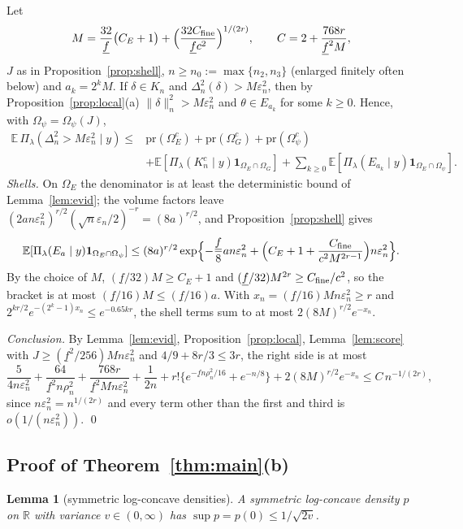 \documentclass[11pt]{article}
\newtheorem{lemma}{Lemma}
\theoremstyle{definition}
\theoremstyle{remark}
\newcommand{\R}{\mathbb{R}}
\newcommand{\E}{\mathbb{E}}
\newcommand{\pr}{\mathrm{pr}}
\newcommand{\en}{\varepsilon_n}
\newcommand{\fl}{\underline f}
\newcommand{\nn}[1]{\|#1\|_n}
\newcommand{\ind}{\mathbf 1}
\begin{document}
Let
\[
M=\frac{32}{\fl}\bigl(C_E+1\bigr)+\Bigl(\frac{32C_{\rm fine}}{\fl c^2}\Bigr)^{1/(2r)},\qquad C=2+\frac{768r}{\fl^2M},
\]
$J$ as in Proposition~\ref{prop:shell}, $n\ge n_0:=\max\{n_2,n_3\}$ (enlarged finitely often below) and $a_k=2^kM$. If $\delta\in K_n$ and $\Delta_n^2(\delta)>M\en^2$, then by Proposition~\ref{prop:local}(a) $\nn{\delta}^2>M\en^2$ and $\theta\in E_{a_k}$ for some $k\ge0$. Hence, with $\Omega_\psi=\Omega_\psi(J)$,
\begin{align*}
\E\,\Pi_\lambda(\Delta_n^2>M\en^2\mid y)\le{}&\pr(\Omega_E^c)+\pr(\Omega_G^c)+\pr(\Omega_\psi^c)\\
&+\E[\Pi_\lambda(K_n^c\mid y)\ind_{\Omega_E\cap\Omega_G}]+\sum_{k\ge0}\E[\Pi_\lambda(E_{a_k}\mid y)\ind_{\Omega_E\cap\Omega_\psi}].
\end{align*}
\emph{Shells.} On $\Omega_E$ the denominator is at least the deterministic bound of Lemma~\ref{lem:evid}; the volume factors leave $(2an\en^2)^{r/2}(\sqrt n\en/2)^{-r}=(8a)^{r/2}$, and Proposition~\ref{prop:shell} gives
\[
\E[\Pi_\lambda(E_a\mid y)\ind_{\Omega_E\cap\Omega_\psi}]\le(8a)^{r/2}\exp\Bigl\{-\frac{\fl}8an\en^2+\Bigl(C_E+1+\frac{C_{\rm fine}}{c^2M^{2r-1}}\Bigr)n\en^2\Bigr\}.
\]
By the choice of $M$, $(\fl/32)M\ge C_E+1$ and $(\fl/32)M^{2r}\ge C_{\rm fine}/c^2$, so the bracket is at most $(\fl/16)M\le(\fl/16)a$. With $x_n=(\fl/16)Mn\en^2\ge r$ and $2^{kr/2}e^{-(2^k-1)x_n}\le e^{-0.65kr}$, the shell terms sum to at most $2(8M)^{r/2}e^{-x_n}$.

\emph{Conclusion.} By Lemma~\ref{lem:evid}, Proposition~\ref{prop:local}, Lemma~\ref{lem:score} with $J\ge(\fl^2/256)Mn\en^2$ and $4/9+8r/3\le3r$, the right side is at most
\[
\frac5{4n\en^2}+\frac{64}{\fl^2n\rho_n^2}+\frac{768r}{\fl^2Mn\en^2}+\frac1{2n}+r!\{e^{-\fl n\rho_n^2/16}+e^{-n/8}\}+2(8M)^{r/2}e^{-x_n}\le C\,n^{-1/(2r)},
\]
since $n\en^2=n^{1/(2r)}$ and every term other than the first and third is $o(1/(n\en^2))$. \qed

\subsection{Proof of Theorem~\ref{thm:main}(b)}

\begin{lemma}[symmetric log-concave densities]\label{lem:lc}
A symmetric log-concave density $p$ on $\R$ with variance $v\in(0,\infty)$ has $\sup p=p(0)\le1/\sqrt{2v}$.
\end{lemma}
\end{document}
